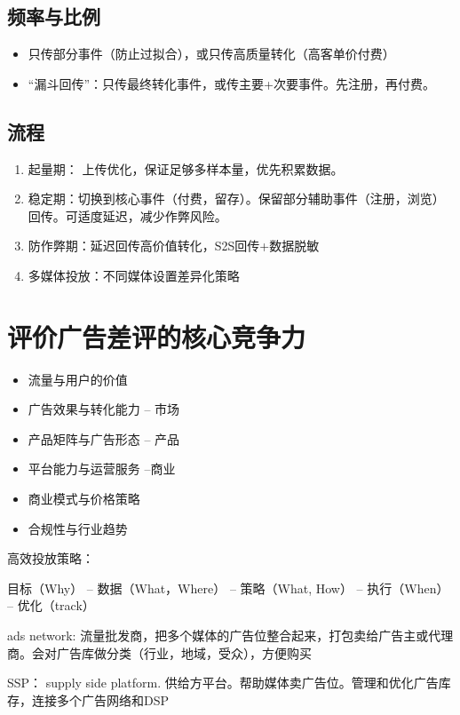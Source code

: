\documentclass{article}
\begin{document}
\begin{itemize}
\subsection{频率与比例}
\begin{itemize}
    \item 只传部分事件（防止过拟合），或只传高质量转化（高客单价付费）
    \item “漏斗回传”：只传最终转化事件，或传主要+次要事件。先注册，再付费。
\end{itemize}

\subsection{流程}
\begin{enumerate}
    \item 起量期： 上传优化，保证足够多样本量，优先积累数据。
    \item 稳定期：切换到核心事件（付费，留存）。保留部分辅助事件（注册，浏览）回传。可适度延迟，减少作弊风险。
    \item 防作弊期：延迟回传高价值转化，S2S回传+数据脱敏
    \item 多媒体投放：不同媒体设置差异化策略
\end{enumerate}


\section{评价广告差评的核心竞争力}
\begin{itemize}
    \item 流量与用户的价值
    \item 广告效果与转化能力 -- 市场
    \item 产品矩阵与广告形态 -- 产品
    \item 平台能力与运营服务 --商业
    \item 商业模式与价格策略
    \item 合规性与行业趋势
\end{itemize}

高效投放策略： 

目标（Why） -- 数据（What，Where） -- 策略（What, How） -- 执行（When） -- 优化（track）

ads network: 流量批发商，把多个媒体的广告位整合起来，打包卖给广告主或代理商。会对广告库做分类（行业，地域，受众），方便购买

SSP： supply side platform.  供给方平台。帮助媒体卖广告位。管理和优化广告库存，连接多个广告网络和DSP


\end{itemize}
\end{document}

